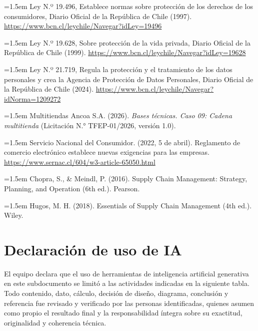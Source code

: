 \documentclass[11pt]{article}
\begin{document}
\noindent\hangindent=1.5em Ley N.º 19.496, Establece normas sobre protección de los derechos de los consumidores, Diario Oficial de la República de Chile (1997). \url{https://www.bcn.cl/leychile/Navegar?idLey=19496}

\noindent\hangindent=1.5em Ley N.º 19.628, Sobre protección de la vida privada, Diario Oficial de la República de Chile (1999). \url{https://www.bcn.cl/leychile/Navegar?idLey=19628}

\noindent\hangindent=1.5em Ley N.º 21.719, Regula la protección y el tratamiento de los datos personales y crea la Agencia de Protección de Datos Personales, Diario Oficial de la República de Chile (2024). \url{https://www.bcn.cl/leychile/Navegar?idNorma=1209272}

\noindent\hangindent=1.5em Multitiendas Ancoa S.A. (2026). \textit{Bases técnicas. Caso 09: Cadena multitienda} (Licitación N.° TFEP-01/2026, versión 1.0).

\noindent\hangindent=1.5em Servicio Nacional del Consumidor. (2022, 5 de abril). Reglamento de comercio electrónico establece nuevas exigencias para las empresas. \url{https://www.sernac.cl/604/w3-article-65050.html}

\noindent\hangindent=1.5em Chopra, S., \& Meindl, P. (2016). Supply Chain Management: Strategy, Planning, and Operation (6th ed.). Pearson.

\noindent\hangindent=1.5em Hugos, M. H. (2018). Essentials of Supply Chain Management (4th ed.). Wiley.

\section*{Declaración de uso de IA}

El equipo declara que el uso de herramientas de inteligencia artificial generativa en este subdocumento se limitó a las actividades indicadas en la siguiente tabla. Todo contenido, dato, cálculo, decisión de diseño, diagrama, conclusión y referencia fue revisado y verificado por las personas identificadas, quienes asumen como propio el resultado final y la responsabilidad íntegra sobre su exactitud, originalidad y coherencia técnica.
\end{document}
